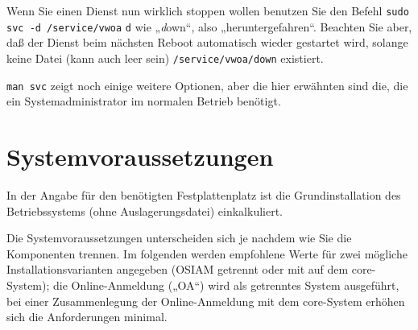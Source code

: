 Wenn Sie einen Dienst nun wirklich stoppen wollen benutzen Sie den Befehl
\texttt{sudo svc -d /service/vwoa} \dash \texttt{d} wie „\emph{d}own“, also
„heruntergefahren“. Beachten Sie aber, daß der Dienst beim nächsten Reboot
automatisch wieder gestartet wird, solange keine Datei (kann auch leer sein)
\texttt{/service/vwoa/down} existiert.

\texttt{man svc} zeigt noch einige weitere Optionen, aber die hier erwähnten
sind die, die ein Systemadministrator im normalen Betrieb benötigt.

\fi%

\section{Systemvoraussetzungen}\label{sec:requirements}

In der Angabe für den benötigten Festplattenplatz ist die
Grundinstallation des Betriebssystems (ohne Auslagerungsdatei)
einkalkuliert.

\ifoa

Die Systemvoraussetzungen unterscheiden sich je nachdem wie Sie die
Komponenten trennen. Im folgenden werden empfohlene Werte für zwei
mögliche Installationsvarianten angegeben (OSIAM getrennt oder mit
auf dem core-System); die Online-Anmeldung („OA“) wird als getrenntes
System ausgeführt, bei einer Zusammenlegung der Online-Anmeldung mit
dem core-System erhöhen sich die Anforderungen minimal.

